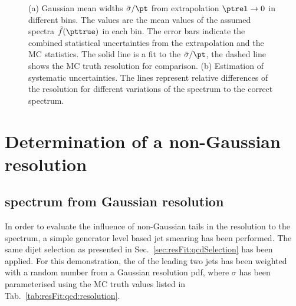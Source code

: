 \documentclass[a4paper]{cmspaper} %
\begin{document}
\begin{figure}[ht]
  \begin{center}
     
  \end{center}
  \caption{(a) Gaussian mean widths $\bar{\sigma}/\pt$ from extrapolation \mbox{$\ptrel\rightarrow0$} in different \pt bins.
  The \pt values are the mean values of the assumed spectra $\tilde{f}(\pttrue)$ in each bin.
  The error bars indicate the combined statistical uncertainties from the extrapolation and the MC statistics.
  The solid line is a fit to the $\bar{\sigma}/\pt$, the dashed line shows the MC truth resolution for comparison.
  (b) Estimation of systematic uncertainties.
  The lines represent relative differences of the resolution for different variations of the spectrum to the correct spectrum.}
\end{figure}
\clearpage


\section{Determination of a non-Gaussian resolution}

\subsection{\mht spectrum from Gaussian resolution}
In order to evaluate the influence of non-Gaussian tails in the resolution to the \mht spectrum, a simple generator level based jet smearing has been performed.
The same dijet selection as presented in Sec.~\ref{sec:resFit:qcdSelection} has been applied.
For this demonstration, the \ptparticle of the leading two jets has been weighted with a random number from a Gaussian resolution pdf, where $\sigma$ has been parameterised using the MC truth values listed in Tab.~\ref{tab:resFit:qcd:resolution}.
\end{document}

